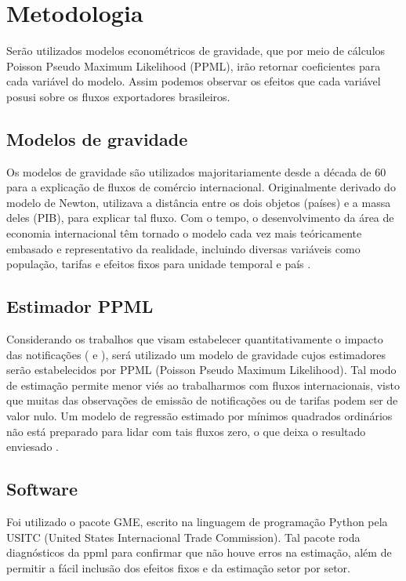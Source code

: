 \documentclass[12pt, a4paper]{article}
\begin{document}
\section{Metodologia}

Serão utilizados modelos econométricos de gravidade, que por meio de cálculos Poisson Pseudo Maximum Likelihood (PPML), irão retornar coeficientes para cada variável do modelo. Assim podemos observar os efeitos que cada variável posusi sobre os fluxos exportadores brasileiros.

\subsection{Modelos de gravidade}

Os modelos de gravidade são utilizados majoritariamente desde a década de 60 para a explicação de fluxos de comércio internacional. Originalmente derivado do modelo de Newton, utilizava a distância entre os dois objetos (países) e a massa deles (PIB), para explicar tal fluxo. Com o tempo, o desenvolvimento da área de economia internacional têm tornado o modelo cada vez mais teóricamente embasado e representativo da realidade, incluindo diversas variáveis como população, tarifas e efeitos fixos para unidade temporal e país \cite{nascimento2013evoluccao}.

\subsection{Estimador PPML}
Considerando os trabalhos que visam estabelecer quantitativamente o impacto das notificações (\cite{impactosprodquimicos} e \cite{ALMEIDA2014}), será utilizado um modelo de gravidade cujos estimadores serão estabelecidos por PPML (Poisson Pseudo Maximum Likelihood). Tal modo de estimação permite menor viés ao trabalharmos com fluxos internacionais, visto que muitas das observações de emissão de notificações ou de tarifas podem ser de valor nulo. Um modelo de regressão estimado por mínimos quadrados ordinários não está preparado para lidar com tais fluxos zero, o que deixa o resultado enviesado \cite{Log_Of_Gravity}.

\subsection{Software}
Foi utilizado o pacote GME, escrito na linguagem de programação Python pela USITC (United States Internacional Trade Commission). Tal pacote roda diagnósticos da ppml para confirmar que não houve erros na estimação, além de permitir a fácil inclusão dos efeitos fixos e da estimação setor por setor.
\end{document}
